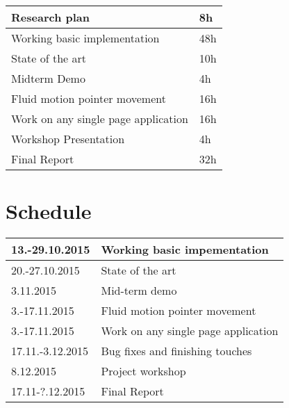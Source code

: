 \documentclass[12pt,a4paper,english,oneside]{article}
\begin{document}
\begin{tabular}{|p{120mm}|p{30mm}|}
  \hline
  Research plan                       & 8h    \\ \hline
  Working basic implementation        & 48h   \\ \hline
  State of the art                    & 10h   \\ \hline
  Midterm Demo                        & 4h    \\ \hline
  Fluid motion pointer movement       & 16h   \\ \hline
  Work on any single page application & 16h   \\ \hline
  Workshop Presentation               & 4h    \\ \hline
  Final Report                        & 32h   \\ \hline
\end{tabular}

\section{Schedule}

\begin{tabular}{|p{30mm}|p{120mm}|}
  \hline
  13.-29.10.2015      & Working basic impementation \\ \hline
  20.-27.10.2015      & State of the art \\ \hline
  3.11.2015           & Mid-term demo \\ \hline
  3.-17.11.2015       & Fluid motion pointer movement \\ \hline
  3.-17.11.2015       & Work on any single page application \\ \hline
  17.11.-3.12.2015    & Bug fixes and finishing touches \\ \hline
  8.12.2015           & Project workshop \\ \hline
  17.11-?.12.2015     & Final Report \\ \hline
\end{tabular}






\end{document}
